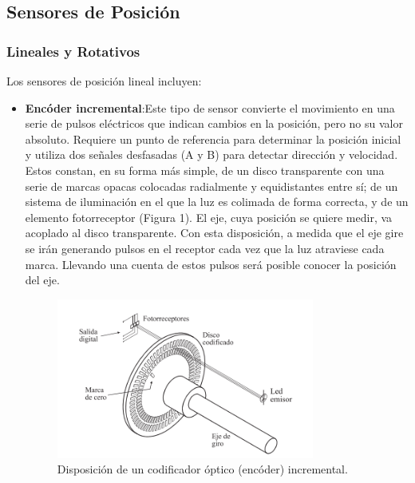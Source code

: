 	\subsection{Sensores de Posición}
\subsubsection{Lineales y Rotativos}
Los sensores de posición lineal incluyen:

\begin{itemize}
	\item \textbf{Encóder incremental}:Este tipo de sensor convierte el movimiento en una serie de pulsos eléctricos que indican cambios en la posición, pero no su valor absoluto. Requiere un punto de referencia para determinar la posición inicial y utiliza dos señales desfasadas (A y B) para detectar dirección y velocidad. Estos constan, en su forma más simple, de un
	disco transparente con una serie de marcas opacas colocadas radialmente y equidistantes entre sí; de un sistema de iluminación en el que la luz es colimada de forma correcta, y de un elemento fotorreceptor (Figura 1). El eje, cuya posición se quiere medir, va acoplado al disco transparente. Con esta disposición, a medida que el eje gire se irán generando pulsos en el receptor cada vez que la luz atraviese cada marca. Llevando una cuenta de estos pulsos será posible conocer la posición del eje.
	\begin{figure}[h]
		\centering
		\includegraphics[width=0.8\textwidth]{img/encoderincremental.png}
		\caption{Disposición de un codificador óptico (encóder) incremental.}
		\label{fig:encoderincremental}
	\end{figure}
	

\end{itemize}
